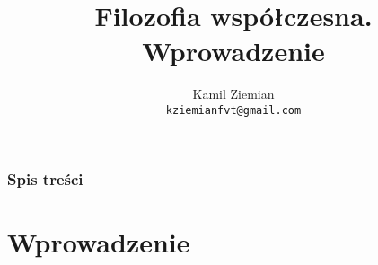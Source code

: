 \documentclass[10pt,t]{beamer}
\title{Filozofia współczesna. Wprowadzenie}
\author{Kamil Ziemian \\
  \texttt{kziemianfvt@gmail.com}}
\begin{document}






\RaggedRight





\maketitle





\begin{frame}
  \frametitle{Spis treści}


  \tableofcontents %

\end{frame}










\section{Wprowadzenie}
\end{document}
